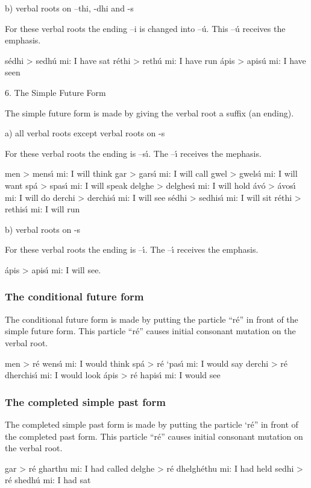b) verbal roots on –thi, -dhi and -s

For these verbal roots the ending –i is changed into –\'{u}. This –\'{u} receives the emphasis.

s\'{e}dhi > sedh\'{u} mi: I have sat
r\'{e}thi > reth\'{u} mi: I have run
\'{a}pis > apis\'{u} mi: I have seen

6. The Simple Future Form

The simple future form is made by giving the verbal root a suffix (an ending).

a) all verbal roots except verbal roots on -s

For these verbal roots the ending is –s\'{\i}. The –\'{\i} receives the mephasis.

men > mens\'{\i} mi: I will think
gar > gars\'{\i} mi: I will call
gwel > gwels\'{\i} mi: I will want
sp\'{a} > spas\'{\i} mi: I will speak
delghe > delghes\'{\i} mi: I will hold
\'{a}v\'{o} > \'{a}vos\'{\i} mi: I will do
derchi > derchis\'{\i} mi: I will see
s\'{e}dhi > sedhis\'{\i} mi: I will sit
r\'{e}thi > rethis\'{\i} mi: I will run

b) verbal roots on -s

For these verbal roots the ending is –\'{\i}. The –\'{\i} receives the emphasis.

\'{a}pis > apis\'{\i} mi: I will see.

\subsubsection{The conditional future form}

The conditional future form is made by putting the particle “r\'{e}” in front of the simple future form. This particle “r\'{e}” causes initial consonant mutation on the verbal root.

men > r\'{e} wens\'{\i} mi: I would think
sp\'{a} > r\'{e} ‘pas\'{\i} mi: I would say
derchi > r\'{e} dherchis\'{\i} mi: I would look
\'{a}pis > r\'{e} hapis\'{\i} mi: I would see

\subsubsection{The completed simple past form}

The completed simple past form is made by putting the particle ‘r\'{e}” in front of the completed past form. This particle “r\'{e}” causes initial consonant mutation on the verbal root.

gar > r\'{e} gharthu mi: I had called
delghe > r\'{e} dhelgh\'{e}thu mi: I had held
sedhi > r\'{e} shedh\'{u} mi: I had sat

